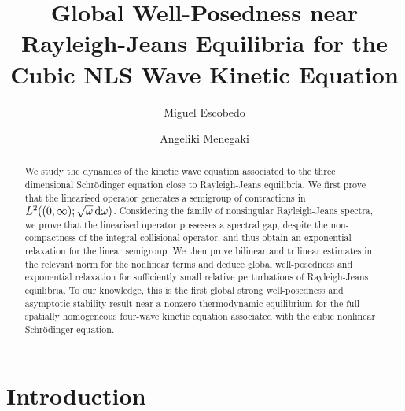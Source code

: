 \documentclass[reqno,11pt,letterpaper]{amsart}
\title[Well-Posedness near Rayleigh-Jeans Equilibria on the whole space]{Global Well-Posedness near Rayleigh-Jeans Equilibria for the Cubic NLS Wave Kinetic Equation}
\author{Miguel Escobedo}
\author{Angeliki Menegaki}
\numberwithin{equation}{section}
\newcommand{\dd}{\, {\rm d}}
\begin{document}
\maketitle


\begin{abstract} 
We study the dynamics of the kinetic wave equation associated to the three dimensional Schr\"{o}dinger equation close to Rayleigh-Jeans equilibria. We first prove that the linearised operator generates a semigroup of contractions in $L^2((0,\infty);\sqrt \omega \dd\omega )$. Considering the family of nonsingular Rayleigh-Jeans spectra, we prove that the linearised operator possesses a spectral gap, despite the non-compactness of the integral collisional operator,  and thus obtain an exponential relaxation for the linear semigroup. 
We then prove bilinear and trilinear estimates in the relevant norm for the nonlinear terms and deduce global well-posedness and exponential relaxation for sufficiently small relative perturbations of Rayleigh-Jeans equilibria. To our knowledge, this is the first global strong well-posedness and asymptotic stability result near a nonzero thermodynamic equilibrium for the full spatially homogeneous
four-wave kinetic equation associated with the cubic
nonlinear Schr\"odinger equation.

\end{abstract}

\tableofcontents

\section{Introduction}
\end{document}
